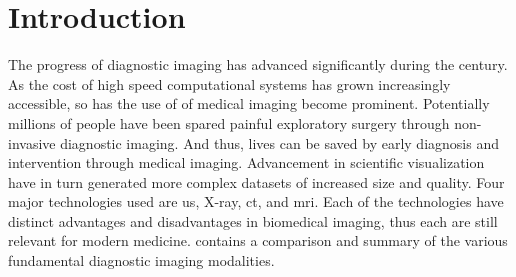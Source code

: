 \chapter{Introduction} \label{cha:introduction}
The progress of diagnostic imaging has advanced significantly during the  century. As the cost of high speed computational systems has grown increasingly accessible, so has the use of of medical imaging become prominent. Potentially millions of people have been spared painful exploratory surgery through non-invasive diagnostic imaging. And thus, lives can be saved by early diagnosis and intervention through medical imaging. Advancement in scientific visualization have in turn generated more complex datasets of increased size and quality. Four major technologies used are \gls{us}, X-ray, \gls{ct}, and \gls{mri}. Each of the technologies have distinct advantages and disadvantages in biomedical imaging, thus each are still relevant for modern medicine.  contains a comparison and summary of the various fundamental diagnostic imaging modalities.

